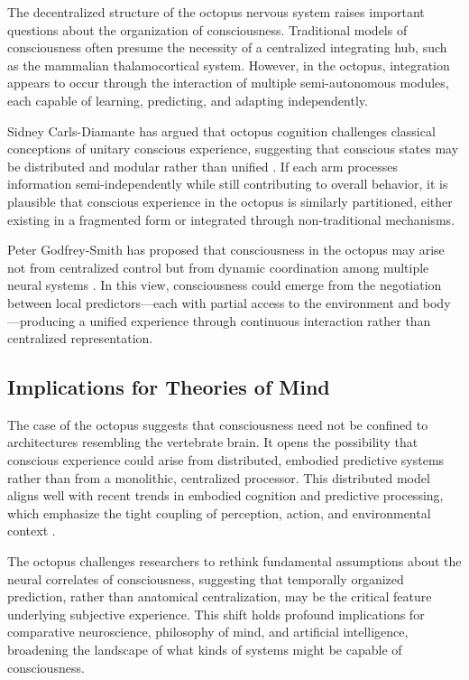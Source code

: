 \documentclass[12pt]{article}
\begin{document}
The decentralized structure of the octopus nervous system raises important questions about the organization of consciousness. Traditional models of consciousness often presume the necessity of a centralized integrating hub, such as the mammalian thalamocortical system. However, in the octopus, integration appears to occur through the interaction of multiple semi-autonomous modules, each capable of learning, predicting, and adapting independently.

Sidney Carls-Diamante has argued that octopus cognition challenges classical conceptions of unitary conscious experience, suggesting that conscious states may be distributed and modular rather than unified \cite{carls-diamante2022octopusconsciousness}. If each arm processes information semi-independently while still contributing to overall behavior, it is plausible that conscious experience in the octopus is similarly partitioned, either existing in a fragmented form or integrated through non-traditional mechanisms.

Peter Godfrey-Smith has proposed that consciousness in the octopus may arise not from centralized control but from dynamic coordination among multiple neural systems \cite{godfrey-smith2016octopus}. In this view, consciousness could emerge from the negotiation between local predictors—each with partial access to the environment and body—producing a unified experience through continuous interaction rather than centralized representation.

\subsection*{Implications for Theories of Mind}

The case of the octopus suggests that consciousness need not be confined to architectures resembling the vertebrate brain. It opens the possibility that conscious experience could arise from distributed, embodied predictive systems rather than from a monolithic, centralized processor. This distributed model aligns well with recent trends in embodied cognition and predictive processing, which emphasize the tight coupling of perception, action, and environmental context \cite{clark2016surfinguncertainty}.

The octopus challenges researchers to rethink fundamental assumptions about the neural correlates of consciousness, suggesting that temporally organized prediction, rather than anatomical centralization, may be the critical feature underlying subjective experience. This shift holds profound implications for comparative neuroscience, philosophy of mind, and artificial intelligence, broadening the landscape of what kinds of systems might be capable of consciousness.




\end{document}

